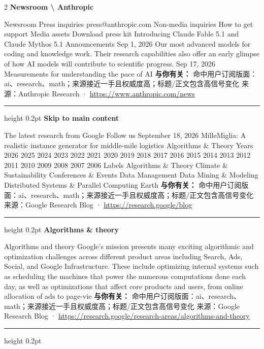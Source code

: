 \documentclass[10.5pt]{ctexart}
\begin{document}
\begin{multicols}{2}
{\large\bfseries Newsroom \textbackslash{} Anthropic}\par
Newsroom Press inquiries press@anthropic.com Non-media inquiries How to get support Media assets Download press kit Introducing Claude Fable 5.1 and Claude Mythos 5.1 Announcements Sep 1, 2026 Our most advanced models for coding and knowledge work. Their research capabilities also offer an early glimpse of how AI models will contribute to scientific progress. Sep 17, 2026 Measurements for understanding the pace of AI
\textbf{与你有关：} 命中用户订阅版面：ai、research、math；来源接近一手且权威度高；标题/正文包含高信号变化
{\footnotesize\color{ormuted} 来源：Anthropic Research · \url{https://www.anthropic.com/news}}
\vspace{2mm}
\hrule height 0.2pt
\vspace{2mm}
{\large\bfseries Skip to main content}\par
The latest research from Google Follow us September 18, 2026 MilleMiglia: A realistic instance generator for middle-mile logistics Algorithms \& Theory Years 2026 2025 2024 2023 2022 2021 2020 2019 2018 2017 2016 2015 2014 2013 2012 2011 2010 2009 2008 2007 2006 Labels Algorithms \& Theory Climate \& Sustainability Conferences \& Events Data Management Data Mining \& Modeling Distributed Systems \& Parallel Computing Earth
\textbf{与你有关：} 命中用户订阅版面：ai、research、math；来源接近一手且权威度高；标题/正文包含高信号变化
{\footnotesize\color{ormuted} 来源：Google Research Blog · \url{https://research.google/blog}}
\vspace{2mm}
\hrule height 0.2pt
\vspace{2mm}
{\large\bfseries Algorithms \& theory}\par
Algorithms and theory Google’s mission presents many exciting algorithmic and optimization challenges across different product areas including Search, Ads, Social, and Google Infrastructure. These include optimizing internal systems such as scheduling the machines that power the numerous computations done each day, as well as optimizations that affect core products and users, from online allocation of ads to page-vie
\textbf{与你有关：} 命中用户订阅版面：ai、research、math；来源接近一手且权威度高；标题/正文包含高信号变化
{\footnotesize\color{ormuted} 来源：Google Research Blog · \url{https://research.google/research-areas/algorithms-and-theory}}
\vspace{2mm}
\hrule height 0.2pt
\vspace{2mm}

\end{multicols}
\end{document}
